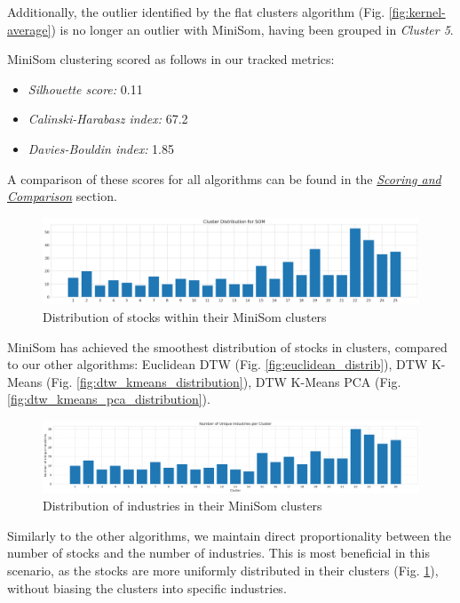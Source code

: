 \documentclass[11pt]{article}
\begin{document}
Additionally, the outlier identified by the flat clusters algorithm (Fig. \ref{fig:kernel-average}) is no longer an outlier with MiniSom, having been grouped in \textit{Cluster 5}.


MiniSom clustering scored as follows in our tracked metrics:
\begin{itemize}
    \item \textit{Silhouette score:} 0.11
    \item \textit{Calinski-Harabasz index:} 67.2
    \item \textit{Davies-Bouldin index:} 1.85
\end{itemize}


A comparison of these scores for all algorithms can be found in the \textit{\hyperref[sec:compare]{Scoring and Comparison}} section.

\begin{figure}[H]
\centering
\includegraphics[width=12cm]{img/MiniSom-distrib.png} 
\caption{Distribution of stocks within their MiniSom clusters}
\label{fig:minisom_distribution}
\end{figure}

MiniSom has achieved the smoothest distribution of stocks in clusters, compared to our other algorithms: Euclidean DTW (Fig. \ref{fig:euclidean_distrib}), DTW K-Means (Fig. \ref{fig:dtw_kmeans_distribution}), DTW K-Means PCA (Fig. \ref{fig:dtw_kmeans_pca_distribution}).


\begin{figure}[H]
\centering
\includegraphics[width=12cm]{img/minisom-industries.png} 
\caption{Distribution of industries in their MiniSom clusters}
\label{fig:minisom_industries}
\end{figure}

Similarly to the other algorithms, we maintain direct proportionality between the number of stocks and the number of industries. This is most beneficial in this scenario, as the stocks are more uniformly distributed in their clusters (Fig. \ref{fig:minisom_distribution}), without biasing the clusters into specific industries. 
\end{document}
